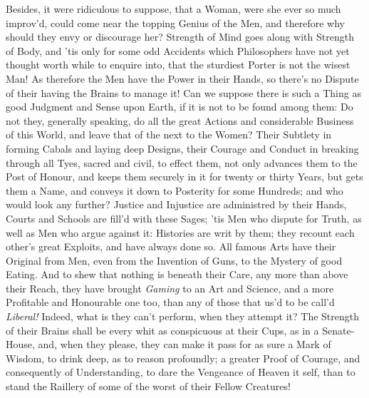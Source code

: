 Besides, it were ridiculous to suppose, that a Woman, were she ever so
much improv'd, could come near the  topping Genius of the
Men, and therefore why should they envy or discourage her? Strength of
Mind goes along with Strength of Body, and 'tis only for some odd
Accidents which Philosophers have not yet thought worth while to
enquire into, that the sturdiest Porter is not the wisest Man! As
therefore the Men have the Power in their Hands, so there's no Dispute
of their having the Brains to manage it! Can we suppose there is such
a Thing as good Judgment and Sense upon Earth, if it is not to be
found among them: Do not they, generally speaking, do all the great
Actions and considerable Business of this World, and leave that of the
next to the Women? Their Subtlety in forming Cabals and laying deep
Designs, their Courage and Conduct in breaking through all Tyes,
sacred and civil, to effect them, not only advances them to the Post
of Honour, and keeps them securely in it for twenty or thirty Years,
but gets them a Name, and conveys it down to Posterity for some
Hundreds; and who would look  any further? Justice and
Injustice are administred by their Hands, Courts and Schools are
fill'd with these Sages; 'tis Men who dispute for Truth, as well as
Men who argue against it: Histories are writ by them; they recount
each other's great Exploits, and have always done so. All famous
Arts have their Original from Men, even from the Invention of Guns, to
the Mystery of good Eating. And to shew that nothing is beneath their
Care, any more than above their Reach, they have brought
\textit{Gaming} to an Art and Science, and a more Profitable and
Honourable one too, than any of those that us'd to be call'd
\textit{Liberal!} Indeed, what is they can't perform, when they
attempt it? The Strength of their Brains shall be every whit as
conspicuous at their Cups, as in a Senate-House, and, when they
please, they can make it pass for as sure a Mark of Wisdom, to drink
deep, as to reason profoundly; a greater Proof of Courage, and
consequently of Understanding, to dare the Vengeance of Heaven it
self,  than to stand the Raillery of some of the worst of
their Fellow Creatures!


